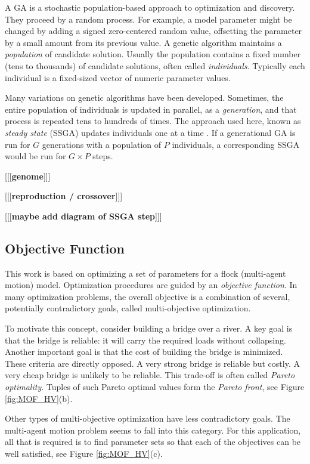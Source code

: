 \documentclass[letterpaper]{article}
\begin{document}
A GA is a stochastic population-based approach to optimization and discovery. They proceed by a random process. For example, a model parameter might be changed by adding a signed zero-centered random value, offsetting the parameter by a small amount from its previous value. A genetic algorithm maintains a \textit{population} of candidate solution. Usually the population contains a fixed number (tens to thousands) of candidate solutions, often called \textit{individuals}. Typically each individual is a fixed-sized vector of numeric parameter values.

Many variations on genetic algorithms have been developed. Sometimes, the entire population of individuals is updated in parallel, as a \textit{generation}, and that process is repeated tens to hundreds of times. The approach used here, known as \textit{steady state} (SSGA) updates individuals one at a time \citep{syswerda_study_1991}. If a generational GA is run for $G$ generations with a population of $P$ individuals, a corresponding SSGA would be run for $G{\times}P$ steps.

[[[\textbf{genome}]]]

[[[\textbf{reproduction / crossover}]]]

[[[\textbf{maybe add diagram of SSGA step}]]]


\subsection{Objective Function}
\label{subsec:ObjectiveFunction}

This work is based on optimizing a set of parameters for a flock (multi-agent motion) model. Optimization procedures are guided by an \textit{objective function}. In many optimization problems, the overall objective is a combination of several, potentially contradictory goals, called multi-objective optimization. 

To motivate this concept, consider building a bridge over a river. A key goal is that the bridge is reliable: it will carry the required loads without collapsing. Another important goal is that the cost of building the bridge is minimized. These criteria are directly opposed. A very strong bridge is reliable but costly. A very cheap bridge is unlikely to be reliable. This trade-off is often called \textit{Pareto optimality}. Tuples of such Pareto optimal values form the \textit{Pareto front}, see Figure \ref{fig:MOF_HV}(b).

Other types of multi-objective optimization have less contradictory goals. The multi-agent motion problem seems to fall into this category. For this application, all that is required is to find parameter sets so that each of the objectives can be well satisfied, see Figure \ref{fig:MOF_HV}(c).
\end{document}

